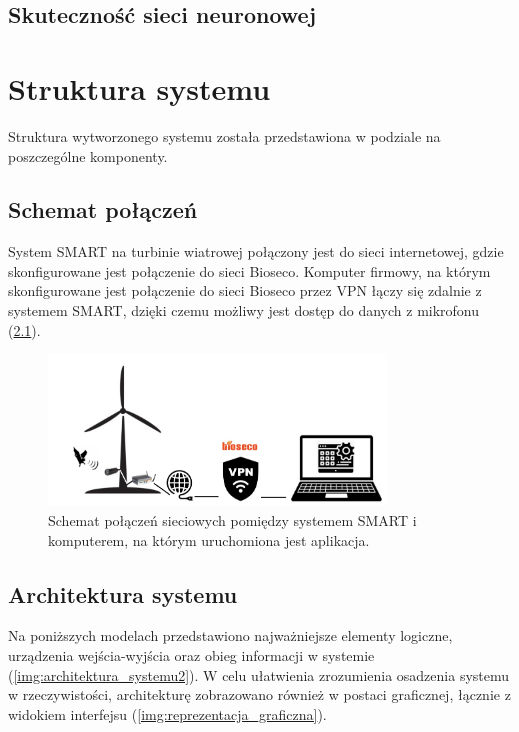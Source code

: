 \documentclass{sprz}
\begin{document}
\section{Skuteczność sieci neuronowej}


\chapter{Struktura systemu}

Struktura wytworzonego systemu została przedstawiona w podziale na poszczególne komponenty.

\section{Schemat połączeń}
System SMART na turbinie wiatrowej połączony jest do sieci internetowej, gdzie skonfigurowane jest połączenie do sieci Bioseco. Komputer firmowy, na którym skonfigurowane jest połączenie do sieci Bioseco przez VPN łączy się zdalnie z systemem SMART, dzięki czemu możliwy jest dostęp do danych z mikrofonu (\ref{img:system-connection}).

\begin{figure}[h] 
  \centering
  \includegraphics[width=0.8\textwidth]{sprz/system-connection.png}
  \caption{Schemat połączeń sieciowych pomiędzy systemem SMART i komputerem, na którym uruchomiona jest aplikacja.}
  \label{img:system-connection}
\end{figure} 


\section{Architektura systemu}

Na poniższych modelach przedstawiono najważniejsze elementy logiczne, urządzenia wejścia-wyjścia oraz obieg informacji w systemie (\ref{img:architektura_systemu2}). W celu ułatwienia zrozumienia osadzenia systemu w rzeczywistości, architekturę zobrazowano również w postaci graficznej, łącznie z widokiem interfejsu (\ref{img:reprezentacja_graficzna}). 
\end{document}
